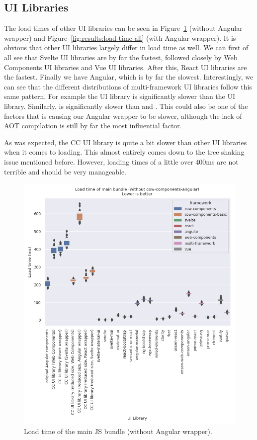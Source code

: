 \subsection{UI Libraries}
The load times of other UI libraries can be seen in Figure~\ref{fig:results:load-time-all-no-angular} (without Angular wrapper) and Figure~\ref{fig:results:load-time-all} (with Angular wrapper). It is obvious that other UI libraries largely differ in load time as well. We can first of all see that Svelte UI libraries are by far the fastest, followed closely by Web Components UI libraries and Vue UI libraries. After this, React UI libraries are the fastest. Finally we have Angular, which is by far the slowest. Interestingly, we can see that the different distributions of multi-framework UI libraries follow this same pattern. For example the  UI library is significantly slower than the  UI library. Similarly,  is significantly slower than  and . This could also be one of the factors that is causing our Angular wrapper to be slower, although the lack of AOT compilation is still by far the most influential factor.

As was expected, the CC UI library is quite a bit slower than other UI libraries when it comes to loading. This almost entirely comes down to the tree shaking issue mentioned before. However, loading times of a little over 400ms are not terrible and should be very manageable.

\begin{figure}[h]
	\includegraphics[width=\columnwidth]{plots/load-time-all-no-angular.png}
	\caption{Load time of the main JS bundle (without Angular wrapper).}
	\label{fig:results:load-time-all-no-angular}
	\centering
\end{figure}

